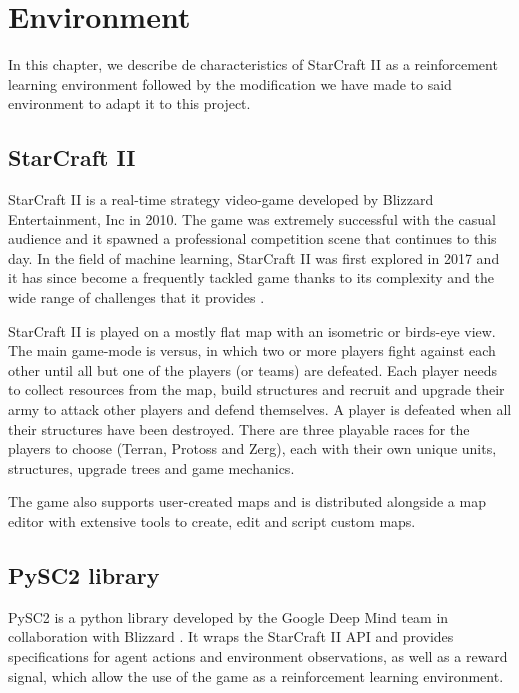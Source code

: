 \chapter{Environment}
\label{chapter:environment}

In this chapter, we describe de characteristics of StarCraft II as a reinforcement learning environment followed by the modification we have made to said environment to adapt it to this project.

\section{StarCraft II}

StarCraft II is a real-time strategy video-game developed by Blizzard Entertainment, Inc in 2010. The game was extremely successful with the casual audience and it spawned a professional competition scene that continues to this day. In the field of machine learning, StarCraft II was first explored in 2017 \cite{Vinyals:2017} and it has since become a frequently tackled game thanks to its complexity and the wide range of challenges that it provides \cite{Tang:2018}.

StarCraft II is played on a mostly flat map with an isometric or birds-eye view. The main game-mode is versus, in which two or more players fight against each other until all but one of the players (or teams) are defeated. Each player needs to collect resources from the map, build structures and recruit and upgrade their army to attack other players and defend themselves. A player is defeated when all their structures have been destroyed. There are three playable races for the players to choose (Terran, Protoss and Zerg), each with their own unique units, structures, upgrade trees and game mechanics.

The game also supports user-created maps and is distributed alongside a map editor with extensive tools to create, edit and script custom maps.

\section{PySC2 library}

PySC2 is a python library developed by the Google Deep Mind team in collaboration with Blizzard \cite{Vinyals:2017}. It wraps the StarCraft II API and provides specifications for agent actions and environment observations, as well as a reward signal, which allow the use of the game as a reinforcement learning environment.

